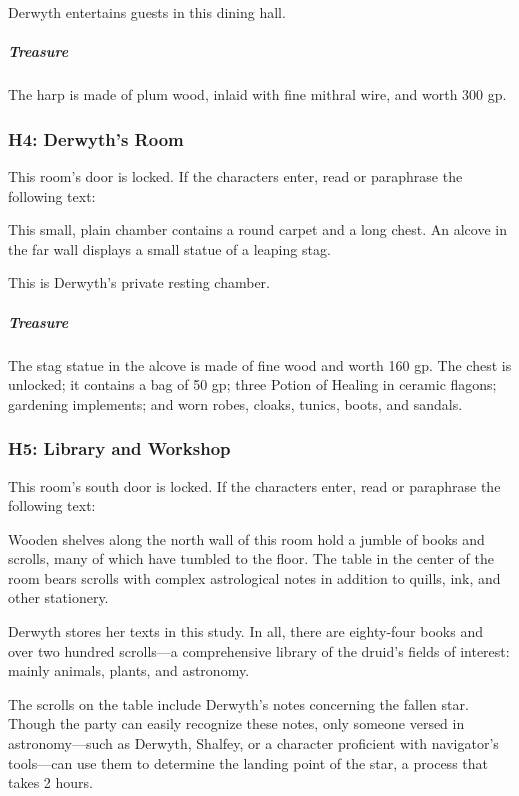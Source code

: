 \documentclass[10pt,a4paper,twoside,bg=print,twocolumn,openany,nodeprecatedcode]{dndbook}
\begin{document}
Derwyth entertains guests in this dining hall.

\subparagraph{Treasure}
The harp is made of plum wood, inlaid with fine mithral wire, and worth 300 gp.

\subsubsection{H4: Derwyth's Room}
This room's door is locked. If the characters enter, read or paraphrase the following text:

\begin{DndReadAloud}{}
This small, plain chamber contains a round carpet and a long chest. An alcove in the far wall displays a small statue of a leaping stag.

\end{DndReadAloud}

This is Derwyth's private resting chamber.

\subparagraph{Treasure}
The stag statue in the alcove is made of fine wood and worth 160 gp. The chest is unlocked; it contains a bag of 50 gp; three Potion of Healing in ceramic flagons; gardening implements; and worn robes, cloaks, tunics, boots, and sandals.

\subsubsection{H5: Library and Workshop}
This room's south door is locked. If the characters enter, read or paraphrase the following text:

\begin{DndReadAloud}{}
Wooden shelves along the north wall of this room hold a jumble of books and scrolls, many of which have tumbled to the floor. The table in the center of the room bears scrolls with complex astrological notes in addition to quills, ink, and other stationery.

\end{DndReadAloud}

Derwyth stores her texts in this study. In all, there are eighty-four books and over two hundred scrolls—a comprehensive library of the druid's fields of interest: mainly animals, plants, and astronomy.

The scrolls on the table include Derwyth's notes concerning the fallen star. Though the party can easily recognize these notes, only someone versed in astronomy—such as Derwyth, Shalfey, or a character proficient with navigator's tools—can use them to determine the landing point of the star, a process that takes 2 hours.
\end{document}

